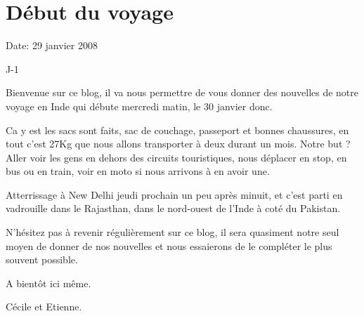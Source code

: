 \section{Début du voyage}

Date: 29 janvier 2008

\begin{multicols}{2}

J-1

Bienvenue sur ce blog, il va nous permettre de vous donner des nouvelles de notre voyage en Inde qui débute mercredi matin, le 30 janvier donc.

Ca y est les sacs sont faits, sac de couchage, passeport et bonnes chaussures, en tout c'est 27Kg que nous allons transporter à deux durant un mois. Notre but ? Aller voir les gens en dehors des circuits touristiques, nous déplacer en stop, en bus ou en train, voir en moto si nous arrivons à en avoir une.

Atterrissage à New Delhi jeudi prochain un peu après minuit, et c'est parti en vadrouille dans le Rajasthan, dans le nord-ouest de l'Inde à coté du Pakistan.

N'hésitez pas à revenir régulièrement sur ce blog, il sera quasiment notre seul moyen de donner de nos nouvelles et nous essaierons de le compléter le plus souvent possible.

A bientôt ici même.

Cécile et Etienne.

\end{multicols}


